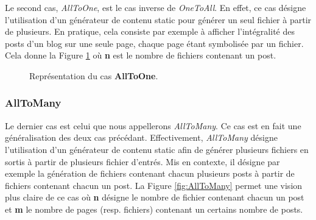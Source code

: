			Le second cas, \textit{AllToOne}, est le cas inverse de \textit{OneToAll}. En effet, ce cas désigne l'utilisation d'un générateur de contenu static pour générer un seul fichier à partir de plusieurs. En pratique, cela consiste par exemple à afficher l'intégralité des posts d'un blog sur une seule page, chaque page étant symbolisée par un fichier. Cela donne la Figure \ref{fig:AllToOne} où \textbf{n} est le nombre de fichiers contenant un post.
		
			\begin{figure}
				\begin{center}
					\caption{Représentation du cas \textbf{AllToOne}.}
					\label{fig:AllToOne}
				\end{center}
			\end{figure}
			
		\subsubsection*{AllToMany}
			
			Le dernier cas est celui que nous appellerons \textit{AllToMany}. Ce cas est en fait une généralisation des deux cas précédant. Effectivement, \textit{AllToMany} désigne l'utilisation d'un générateur de contenu static afin de générer plusieurs fichiers en sortis à partir de plusieurs fichier d'entrés. Mis en contexte, il désigne par exemple la génération de fichiers contenant chacun plusieurs posts à partir de fichiers contenant chacun un post. La Figure \ref{fig:AllToMany} permet une vision plus claire de ce cas où \textbf{n} désigne le nombre de fichier contenant chacun un post et \textbf{m} le nombre de pages (resp. fichiers) contenant un certains nombre de posts.\\
			
